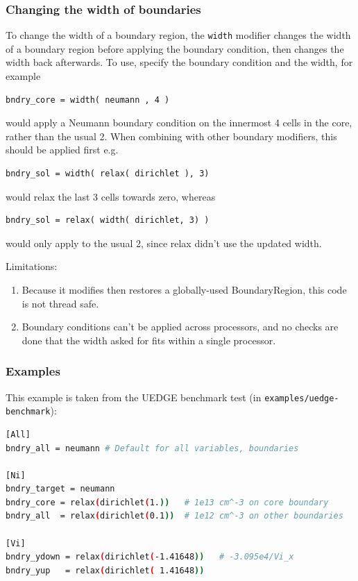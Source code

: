\documentclass[12pt]{article}
\newcommand{\code}[1]{\texttt{#1}}
\begin{document}
\subsubsection{Changing the width of boundaries}

To change the width of a boundary region, the \code{width} modifier
changes the width of a boundary region before applying the boundary condition,
then changes the width back afterwards. To use, specify the boundary condition and the width,
for example
\begin{lstlisting}[numbers=none]
bndry_core = width( neumann , 4 )
\end{lstlisting}
would apply a Neumann boundary condition on the innermost 4 cells in the core, rather than the usual 2. 
When combining with other boundary modifiers, this should be applied first e.g.
\begin{lstlisting}[numbers=none]
bndry_sol = width( relax( dirichlet ), 3)
\end{lstlisting}
would relax the last 3 cells towards zero, whereas
\begin{lstlisting}[numbers=none]
bndry_sol = relax( width( dirichlet, 3) )
\end{lstlisting}
would only apply to the usual 2, since relax didn't use the updated width.

Limitations: 
\begin{enumerate}
  \item Because it modifies then restores a globally-used BoundaryRegion,
    this code is not thread safe.

  \item Boundary conditions can't be applied across processors, and no checks
    are done that the width asked for fits within a single processor.
\end{enumerate}

\subsubsection{Examples}

This example is taken from the UEDGE benchmark test (in \texttt{examples/uedge-benchmark}):
\begin{lstlisting}[language=bash,numbers=none]
[All]
bndry_all = neumann # Default for all variables, boundaries
  
[Ni]
bndry_target = neumann
bndry_core = relax(dirichlet(1.))   # 1e13 cm^-3 on core boundary
bndry_all  = relax(dirichlet(0.1))  # 1e12 cm^-3 on other boundaries

[Vi]
bndry_ydown = relax(dirichlet(-1.41648))   # -3.095e4/Vi_x
bndry_yup   = relax(dirichlet( 1.41648))
\end{lstlisting}
\end{document}
